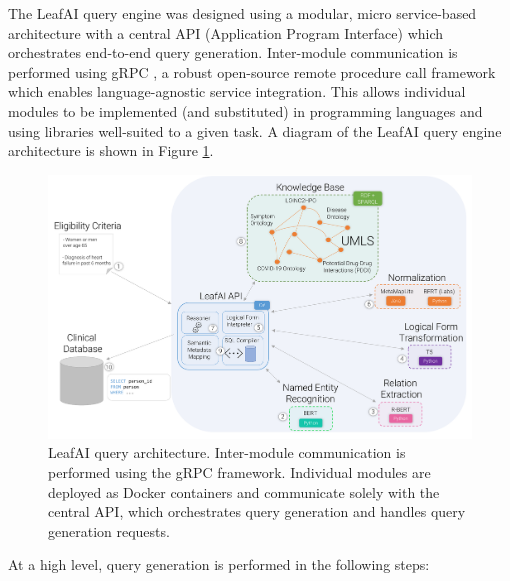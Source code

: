 \documentclass[../main.tex]{subfiles}
\begin{document}
The LeafAI query engine was designed using a modular, micro service-based architecture with a central API (Application Program Interface) which orchestrates end-to-end query generation. Inter-module communication is performed using gRPC \cite{grpc}, a robust open-source remote procedure call framework which enables language-agnostic service integration. This allows individual modules to be implemented (and substituted) in programming languages and using libraries well-suited to a given task. A diagram of the LeafAI query engine architecture is shown in Figure \ref{aim2_fig_leafai_architecture}. 

\begin{figure}[h]
  \includegraphics[scale=0.65]{Figures/Aim2/aim2_leafai_architecture.pdf}  
\caption{LeafAI query architecture. Inter-module communication is performed using the gRPC framework. Individual modules are deployed as Docker \cite{docker} containers and communicate solely with the central API, which orchestrates query generation and handles query generation requests.}
\label{aim2_fig_leafai_architecture}
\end{figure}

At a high level, query generation is performed in the following steps:
\end{document}

